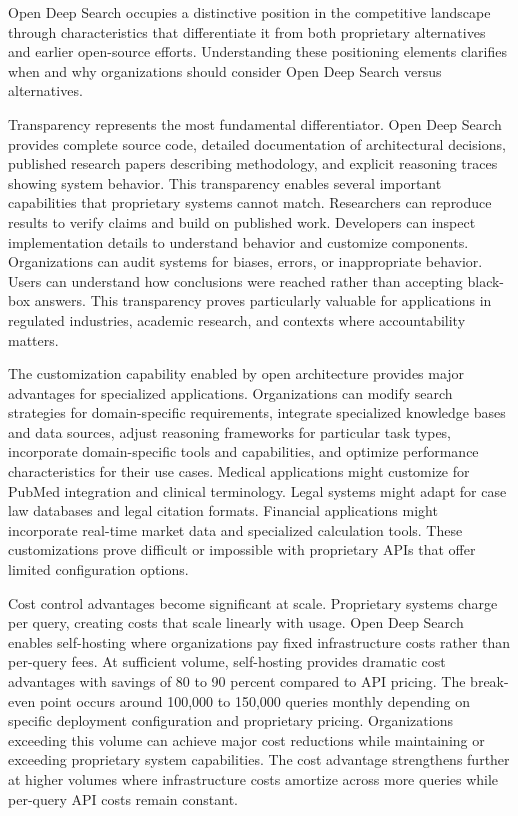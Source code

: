 Open Deep Search occupies a distinctive position in the competitive landscape through characteristics that differentiate it from both proprietary alternatives and earlier open-source efforts. Understanding these positioning elements clarifies when and why organizations should consider Open Deep Search versus alternatives.

Transparency represents the most fundamental differentiator. Open Deep Search provides complete source code, detailed documentation of architectural decisions, published research papers describing methodology, and explicit reasoning traces showing system behavior. This transparency enables several important capabilities that proprietary systems cannot match. Researchers can reproduce results to verify claims and build on published work. Developers can inspect implementation details to understand behavior and customize components. Organizations can audit systems for biases, errors, or inappropriate behavior. Users can understand how conclusions were reached rather than accepting black-box answers. This transparency proves particularly valuable for applications in regulated industries, academic research, and contexts where accountability matters.

The customization capability enabled by open architecture provides major advantages for specialized applications. Organizations can modify search strategies for domain-specific requirements, integrate specialized knowledge bases and data sources, adjust reasoning frameworks for particular task types, incorporate domain-specific tools and capabilities, and optimize performance characteristics for their use cases. Medical applications might customize for PubMed integration and clinical terminology. Legal systems might adapt for case law databases and legal citation formats. Financial applications might incorporate real-time market data and specialized calculation tools. These customizations prove difficult or impossible with proprietary APIs that offer limited configuration options.

Cost control advantages become significant at scale. Proprietary systems charge per query, creating costs that scale linearly with usage. Open Deep Search enables self-hosting where organizations pay fixed infrastructure costs rather than per-query fees. At sufficient volume, self-hosting provides dramatic cost advantages with savings of 80 to 90 percent compared to API pricing. The break-even point occurs around 100,000 to 150,000 queries monthly depending on specific deployment configuration and proprietary pricing. Organizations exceeding this volume can achieve major cost reductions while maintaining or exceeding proprietary system capabilities. The cost advantage strengthens further at higher volumes where infrastructure costs amortize across more queries while per-query API costs remain constant.

